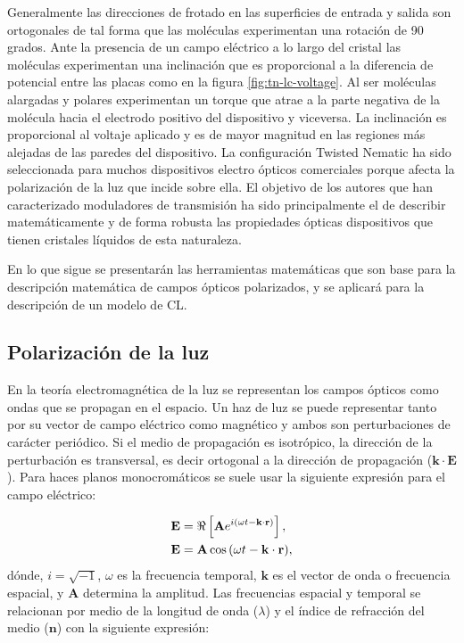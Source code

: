 Generalmente las direcciones de frotado en las superficies de entrada
y salida son ortogonales de tal forma que las moléculas experimentan
una rotación de 90 grados. Ante la presencia de un campo eléctrico a
lo largo del cristal las moléculas experimentan una inclinación que es
proporcional a la diferencia de potencial entre las placas como en la
figura \ref{fig:tn-lc-voltage}. Al ser moléculas alargadas y polares
experimentan un torque que atrae a la parte negativa de la molécula
hacia el electrodo positivo del 
dispositivo y viceversa. La inclinación es proporcional al voltaje
aplicado y es de mayor magnitud en las regiones más alejadas
de las paredes del dispositivo. La configuración Twisted Nematic ha
sido seleccionada para muchos dispositivos electro ópticos comerciales porque afecta
la polarización de la luz que incide sobre ella. El objetivo de  los
autores que han caracterizado moduladores de transmisión ha sido
principalmente el de describir matemáticamente y de forma robusta las
propiedades ópticas dispositivos que tienen cristales líquidos de esta naturaleza. 

En lo que sigue se presentarán las herramientas matemáticas que son
base para la descripción matemática de campos ópticos polarizados, y
se aplicará para la descripción de un modelo de CL.

\subsection{Polarización de la luz}

En la teoría electromagnética de la luz se representan los campos
ópticos como ondas que se propagan en el espacio. Un haz de luz
se puede representar tanto por su vector de campo eléctrico como
magnético y ambos son perturbaciones de carácter periódico. Si el
medio de propagación es isotrópico, la dirección de la perturbación 
es transversal, es decir ortogonal a la dirección de propagación
($\mathbf{k}\cdot\mathbf{E}$). Para haces planos monocromáticos se
suele usar la siguiente expresión para el campo eléctrico:  

\begin{align}
\mathbf{E} &=\Re\left[\mathbf{A}e^{i\left( \omega t -\mathbf{k}\cdot \mathbf{r}\right)}\right]\label{eq:complex_field},\\
\mathbf{E} &=\mathbf{A}\cos{ \left(\omega t -\mathbf{k}\cdot
    \mathbf{r}\right)},\notag
\end{align}
dónde, $i = \sqrt{-1}$, $\omega$ es la frecuencia temporal, $\mathbf{k}$ es el vector de
onda o frecuencia espacial, y $\mathbf{A}$ determina la amplitud.
Las frecuencias espacial y temporal se relacionan por medio de la
longitud de onda  ($\lambda$) y el índice de refracción del medio ($\mathbf{n}$) con la
siguiente expresión:

